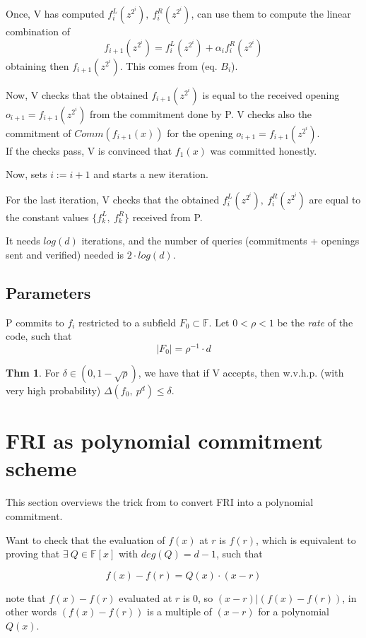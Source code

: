 \documentclass{article}
\theoremstyle{definition}
\newtheorem{theorem}[definition]{Thm}
\begin{document}
Once, V has computed $f_i^L(z^{2^i}),~f_i^R(z^{2^i})$, can use them to compute the linear combination of
$$
f_{i+1}(z^{2^i}) = f_i^L(z^{2^i}) + \alpha_i f_i^R(z^{2^i})
$$
obtaining then $f_{i+1}(z^{2^i})$. This comes from (eq. $B_i$).

Now, V checks that the obtained $f_{i+1}(z^{2^i})$ is equal to the received opening $o_{i+1}=f_{i+1}(z^{2^i})$ from the commitment done by P.
V checks also the commitment of $Comm(f_{i+1}(x))$ for the opening $o_{i+1}=f_{i+1}(z^{2^i})$.\\
If the checks pass, V is convinced that $f_1(x)$ was committed honestly.

Now, sets $i := i+1$ and starts a new iteration.

For the last iteration, V checks that the obtained $f_i^L(z^{2^i}),~f_i^R(z^{2^i})$ are equal to the constant values $\{f_k^L,~f_k^R\}$ received from P.

\vspace{10px}
It needs $log(d)$ iterations, and the number of queries (commitments + openings sent and verified) needed is $2 \cdot log(d)$.

\subsection{Parameters}

P commits to $f_i$ restricted to a subfield $F_0 \subset \mathbb{F}$.
Let $0<\rho<1$ be the \emph{rate} of the code, such that
$$|F_0| = \rho^{-1} \cdot d$$

\begin{theorem}
	For $\delta \in (0, 1-\sqrt{\rho})$, we have that if V accepts, then w.v.h.p. (with very high probability) $\Delta(f_0,~ p^d) \leq \delta$.
\end{theorem}

\section{FRI as polynomial commitment scheme}
This section overviews the trick from \cite{cryptoeprint:2019/1020} to convert FRI into a polynomial commitment.

Want to check that the evaluation of $f(x)$ at $r$ is $f(r)$, which is equivalent to proving that $\exists ~Q \in \mathbb{F}[x]$ with $deg(Q)=d-1$, such that

$$
f(x)-f(r) = Q(x) \cdot (x-r)
$$

note that $f(x)-f(r)$ evaluated at $r$ is $0$, so $(x-r) | (f(x)-f(r))$, in other words
$(f(x)-f(r))$ is a multiple of $(x-r)$ for a polynomial $Q(x)$.
\end{document}
